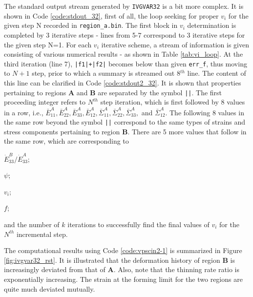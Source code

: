 \documentclass[12pt]{amsart}
\begin{document}
The standard output stream generated by \verb$IVGVAR32$ is a bit more complex.
It is shown in Code \ref{code:stdout_32}, first of all, the loop seeking for proper $v_i$ for the given step N recorded in \verb$region_a.bin$.
The first block in $v_i$ determination is completed by 3 iterative steps - lines from 5-7 correspond to 3 iterative steps for the given step N=1.
For each $v_i$ iterative scheme, a stream of information is given consisting of various numerical results - as shown in Table \ref{tab:vi_loop}.
At the third iteration (line 7), \verb$|f1|+|f2|$ becomes below than given \verb$err_f$, thus moving to $N+1$ step, prior to which a summary is streamed out 8$^{th}$ line.
The content of this line can be clarified in Code \ref{code:stdout2_32}.
It is shown that properties pertaining to regions \textbf{A} and \textbf{B} are separated by the symbol \verb$||$.
The first proceeding integer refers to $N^{th}$ step iteration, which is first followed by 8 values in a row, i.e.,
$\bar{E}^A_{11}, \bar{E}^A_{22}, \bar{E}^A_{33}, \bar{E}^A_{12}, \bar{\Sigma}^A_{11}, \bar{\Sigma}^A_{22}, \bar{\Sigma}^A_{33},$ and $\bar{\Sigma}^A_{12}$.
The following 8 values in the same row beyond the symbol \verb$||$ correspond to the same types of strains and stress components pertaining to region \textbf{B}.
There are 5 more values that follow in the same row, which are corresponding to
\begin{inparaenum}[]
\item $\dot{E}_{33}^B/\dot{E}_{33}^A$;
\item $\psi$;
\item $v_i$;
\item $f$;
\item and the number of $k$ iterations to successfully find the final values of $v_i$ for the $N^{th}$ incremental step.
\end{inparaenum}
The computational results using Code \ref{code:vpscin2-1} is summarized in Figure \ref{fig:ivgvar32_rst}.
It is illustrated that the deformation history of region \textbf{B} is increasingly deviated from that of \textbf{A}.
Also, note that the thinning rate ratio is exponentially increasing.
The strain at the forming limit for the two regions are quite much deviated mutually.
\end{document}
